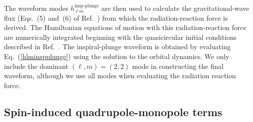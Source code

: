 \documentclass[prd,aps,letter,twocolumn,floatfix,notitlepage,nofootinbib]{revtex4-1}
\begin{document}
The waveform modes $h_{\ell m}^{\textrm{insp-plunge}}$ are then used to calculate the gravitational-wave flux (Eqs.~(5) and~(6) of Ref.~\cite{Dietrich:2017feu}) from which the radiation-reaction force is derived. The Hamiltonian equations of motion with this radiation-reaction force are numerically integrated beginning with the quasicircular initial conditions described in Ref.~\cite{Buonanno:2005xu}. The inspiral-plunge waveform is obtained by evaluating Eq.~(\ref{hlminspplunge}) using the solution to the orbital dynamics. We only include the dominant $(\ell,m)=(2,2)$ mode in constructing the final waveform, although we use all modes when evaluating the radiation reaction force.


\subsection{Spin-induced quadrupole-monopole terms}
\label{subsec:QM}
\end{document}

